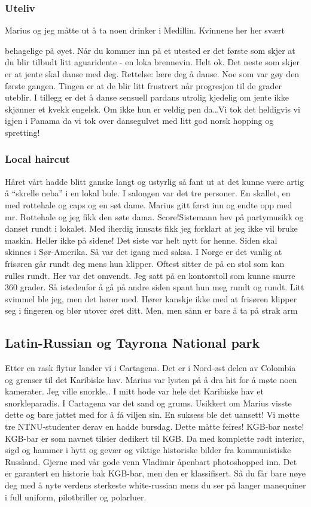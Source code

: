 \subsubsection{Uteliv}

Marius og jeg måtte ut å ta noen drinker i Medillin. Kvinnene her her svært

behagelige på øyet. Når du kommer inn på et utested er det første som skjer
at du blir tilbudt litt aguaridente - en loka brennevin. Helt ok. Det
neste som skjer er at jente skal danse med deg. Rettelse: lære deg å
danse. Noe som var gøy den første gangen. Tingen er at de blir litt
frustrert når progresjon til de grader uteblir. I tillegg er det
å danse sensuell pardans utrolig kjedelig om jente ikke skjønner et
kvekk engelsk. Om ikke hun er veldig pen da\ldots Vi tok det heldigvis vi igjen i Panama da vi tok over
dansegulvet med litt god norsk hopping og spretting!

\subsubsection{Local haircut}

Håret vårt hadde blitt ganske langt og ustyrlig så fant ut  at det
kunne være artig å ``skrelle neba'' i en lokal bule. I salongen var
det tre personer. En skallet, en med rottehale og caps og en søt dame.
Marius gitt først inn og endte opp med mr. Rottehale og jeg fikk den søte
dama. Score!Sistemann hev på partymusikk og danset rundt i lokalet. Med
iherdig innsats fikk jeg forklart at jeg ikke vil bruke maskin. Heller
ikke på sidene! Det siste var helt nytt for henne. Siden skal skinnes
i Sør-Amerika. Så var det igang med saksa. I Norge er det vanlig at
frisøren går rundt deg mens hun klipper. Oftest sitter de på en stol
som kan rulles rundt. Her var det omvendt. Jeg satt på en kontorstoll
som kunne snurre 360 grader. Så istedenfor å gå på andre siden spant
hun meg rundt og rundt. Litt svimmel ble jeg, men det hører med.
Hører kanskje ikke med at frisøren klipper seg i fingeren og blør
utover øret ditt. Men, men sånn er bare å ta på strak arm

\subsection*{Latin-Russian og Tayrona National park}

Etter en rask flytur lander vi i Cartagena. Det er i Nord-øst delen
av Colombia og grenser til det Karibiske hav. Marius var lysten på å
dra hit for å møte noen kamerater. Jeg ville snorkle.. I mitt hode var hele det Karibiske hav et snorkleparadis. I
Cartagena var det sand og grums. Usikkert om Marius visste dette og
bare jattet med for å få viljen sin. En suksess ble det uansett! Vi møtte tre NTNU-studenter derav en
hadde bursdag. Dette måtte feires! KGB-bar neste! KGB-bar er som
navnet tilsier dedikert til KGB. Da med komplette rødt interiør,
sigd og hammer i hytt og gevær og viktige historiske bilder fra
kommunistiske Russland. Gjerne med vår gode venn Vladimir åpenbart
photoshopped inn. Det er garantert en historie bak KGB-bar, men den er
klassifisert. Så du får bare nøye deg med å nyte verdens sterkeste
white-russian mens du ser på langer manequiner i full uniform,
pilotbriller og polarluer. 


